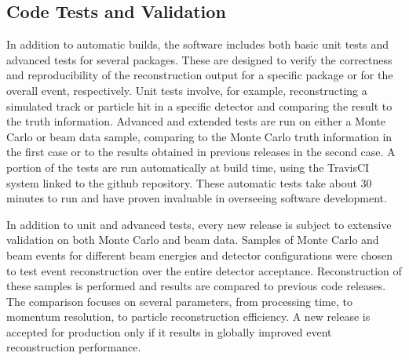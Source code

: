 \subsection{Code Tests and Validation}
\label{sec:tests}

In addition to automatic builds, the software includes both basic unit tests and advanced tests for several
packages. These are designed to verify the correctness and reproducibility of the reconstruction output for a
specific package or for the overall event, respectively. Unit tests involve, for example, reconstructing a simulated
track or particle hit in a specific detector and comparing the result to the truth information. Advanced and extended
tests are run on either a Monte Carlo or beam data sample, comparing to the Monte Carlo truth information in the first
case or to the results obtained in previous releases in the second case. A portion of the tests are run automatically
at build time, using the TravisCI system linked to the github repository.  These automatic tests take about 30
minutes to run and have proven invaluable in overseeing software development.

In addition to unit and advanced tests, every new release is subject to extensive validation on both Monte Carlo and
beam data. Samples of Monte Carlo and beam events for different beam energies and detector configurations were
chosen to test event reconstruction over the entire detector acceptance. Reconstruction of these samples is
performed and results are compared to previous code releases. The comparison focuses on several parameters, from
processing time, to momentum resolution, to particle reconstruction efficiency. A new release is accepted for
production only if it results in globally improved event reconstruction performance. 
